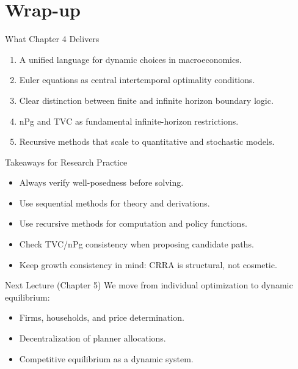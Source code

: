\documentclass[aspectratio=169,10pt]{beamer}
\begin{document}
\section{Wrap-up}

\begin{frame}{What Chapter 4 Delivers}
\begin{enumerate}
  \item A unified language for dynamic choices in macroeconomics.
  \item Euler equations as central intertemporal optimality conditions.
  \item Clear distinction between finite and infinite horizon boundary logic.
  \item nPg and TVC as fundamental infinite-horizon restrictions.
  \item Recursive methods that scale to quantitative and stochastic models.
\end{enumerate}
\end{frame}

\begin{frame}{Takeaways for Research Practice}
\begin{itemize}
  \item Always verify well-posedness before solving.
  \item Use sequential methods for theory and derivations.
  \item Use recursive methods for computation and policy functions.
  \item Check TVC/nPg consistency when proposing candidate paths.
  \item Keep growth consistency in mind: CRRA is structural, not cosmetic.
\end{itemize}
\end{frame}

\begin{frame}{Next Lecture (Chapter 5)}
We move from individual optimization to dynamic equilibrium:
\begin{itemize}
  \item Firms, households, and price determination.
  \item Decentralization of planner allocations.
  \item Competitive equilibrium as a dynamic system.
\end{itemize}
\end{frame}
\end{document}

